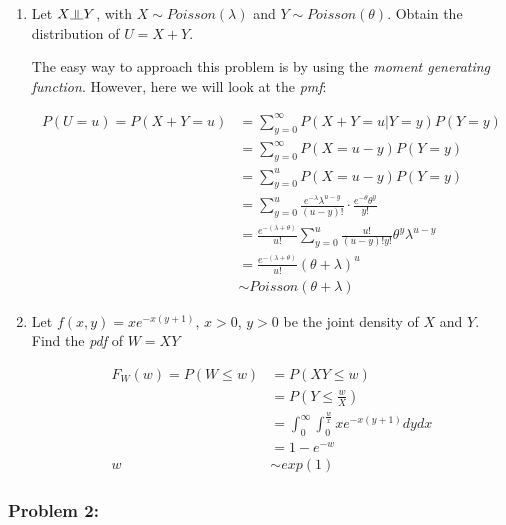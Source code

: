 \documentclass{article}
\newcommand{\indep}{\rotatebox[origin=c]{90}{$\models$}}
\begin{document}
\begin{enumerate}
    \item Let $X \indep Y$, with $X\sim Poisson(\lambda)$ and $Y\sim Poisson(\theta)$. Obtain the distribution of $U = X + Y$.
    
    The easy way to approach this problem is by using the \textit{moment generating function}. However, here we will look at the \textit{pmf}:
    
    \begin{equation*}
        \begin{split}
            P(U = u) = P(X+Y = u) &= \sum_{y=0}^\infty P(X+Y = u | Y=y) P(Y=y)\\
                                &= \sum_{y=0}^\infty P(X=u-y)P(Y=y)\\
                                &= \sum_{y=0}^u P(X=u-y)P(Y=y)\\
                                 &= \sum_{y=0}^u \frac{e^{-\lambda}\lambda^{u-y}}{(u-y)!} \cdot \frac{e^{-\theta}\theta^y}{y!}\\
                                 &= \frac{e^{-(\lambda+\theta)}}{u!} \sum_{y=0}^u \frac{u!}{(u-y)!y!} \theta^y \lambda^{u-y}\\
                                 &= \frac{e^{-(\lambda+\theta)}}{u!} (\theta + \lambda)^u\\
                                 &\sim Poisson(\theta + \lambda)
        \end{split}
    \end{equation*}
    
    \item Let $f(x,y) = xe^{-x(y+1)}$, $x>0$, $y>0$ be the joint density of $X$ and $Y$. Find the \textit{pdf} of $W = XY$
    
    \begin{equation*}
        \begin{split}
            F_W(w) = P(W\leq w) &= P(XY\leq w)\\
            &= P \left(Y \leq \frac{w}{X} \right)\\
            &= \int_0^\infty \int_0^{\frac{w}{x}} xe^{-x(y+1)} dy dx\\
            &= 1 - e^{-w}\\
            w &\sim exp(1)
        \end{split}
    \end{equation*}
\end{enumerate}

\subsubsection{Problem 2:}
\end{document}
